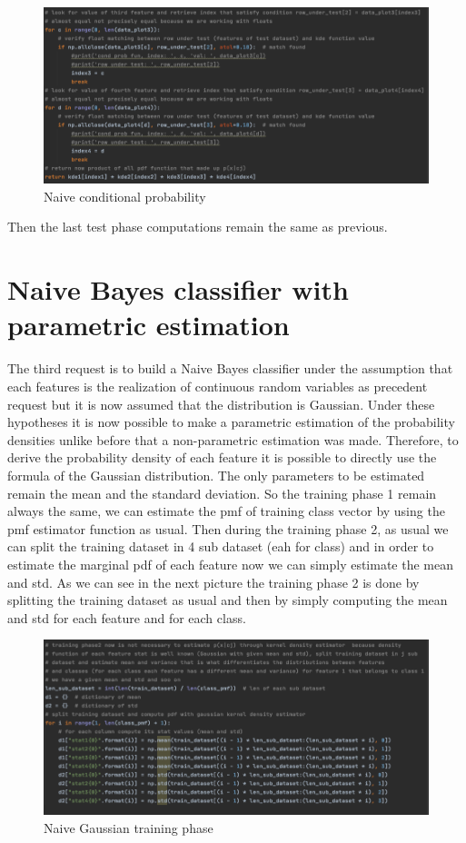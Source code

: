 \documentclass[12pt]{report}
\begin{document}
\begin{figure}[h!]
    \centering
    \includegraphics[width=16cm]{Pictures/Naive conditional prob.png}
    \caption{Naive conditional probability}
\end{figure}

\newpage
Then the last test phase computations remain the same as previous.
\section{Naive Bayes classifier with parametric estimation}
The third request is to build a Naive Bayes classifier under the assumption that each features is the realization of continuous random variables as precedent request but it is now assumed that the distribution is Gaussian. Under these hypotheses it is now possible to make a parametric estimation of the probability densities unlike before that a non-parametric estimation was made. Therefore, to derive the probability density of each feature it is possible to directly use the formula of the Gaussian distribution. The only parameters to be estimated remain the mean and the standard deviation. So the training phase 1 remain always the same, we can estimate the pmf of training class vector by using the pmf estimator function as usual. Then during the training phase 2, as usual we can split the training dataset in 4 sub dataset (eah for class) and in order to estimate the marginal pdf of each feature now we can simply estimate the mean and std. As we can see in the next picture the   training phase 2 is done by splitting the training dataset as usual and then by simply computing the mean and std for each feature and for each class.


\begin{figure}[h!]
    \centering
    \includegraphics[width=13cm]{Pictures/Training phase naive gaussian.png}
    \caption{Naive Gaussian training phase}
\end{figure}
\end{document}

